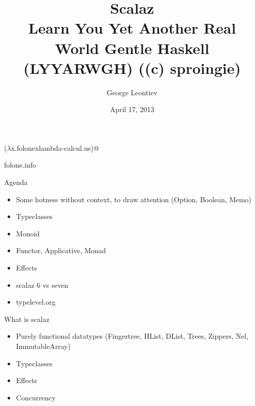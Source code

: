 \documentclass{beamer}
\title[Scalaz]{Scalaz\\Learn You Yet Another Real World Gentle Haskell (LYYARWGH) ((c) sproingie)}
\author{George Leontiev}
\institute{deltamethod GmbH}
\date{April 17, 2013}
\begin{document}
\begin{frame}
\titlepage
\centerline{($\lambda$x.folonexlambda-calcul.us)@}
\centerline{folone.info}
\end{frame}

\begin{frame}{Agenda}
  \begin{itemize}
    \item Some hotness without context, to draw attention (Option, Boolean, Memo)
    \item Typeclasses
    \item Monoid
    \item Functor, Applicative, Monad
    \item Effects
    \item scalaz 6 vs seven
    \item typelevel.org
  \end{itemize}
\end{frame}

\begin{frame}{What is scalaz}
  \begin{itemize}
    \item Purely functional datatypes (Fingertree, HList, DList, Trees, Zippers, Nel, ImmutableArray)
    \item Typeclasses
    \item Effects
    \item Concurrency
  \end{itemize}
\end{frame}
\end{document}
